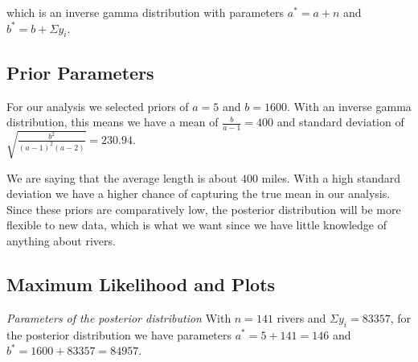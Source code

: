 \documentclass[12pt]{article}
\begin{document}
\noindent which is an inverse gamma distribution with parameters $a^*=a+n$ and $b^*=b+\Sigma y_i$.


\subsection{Prior Parameters}

\noindent For our analysis we selected priors of $a=5$ and $b=1600$.  With an inverse gamma distribution, this means we have a mean of $\frac{b}{a-1}=400$ and standard deviation of $\sqrt{\frac{b^2}{(a-1)^2(a-2)}}=230.94$.
\bigskip

\noindent We are saying that the average length is about $400$ miles.  With a high standard deviation we have a higher chance of capturing the true mean in our analysis.  Since these priors are comparatively low, the posterior distribution will be more flexible to new data, which is what we want since we have little knowledge of anything about rivers.

\subsection{Maximum Likelihood and Plots}

%

\noindent \emph{Parameters of the posterior distribution} With $n=141$ rivers and $\Sigma y_i=83357$, for the posterior distribution we have parameters $a^*=5+141=146$ and $b^*=1600+83357=84957$.
\bigskip
\end{document}
